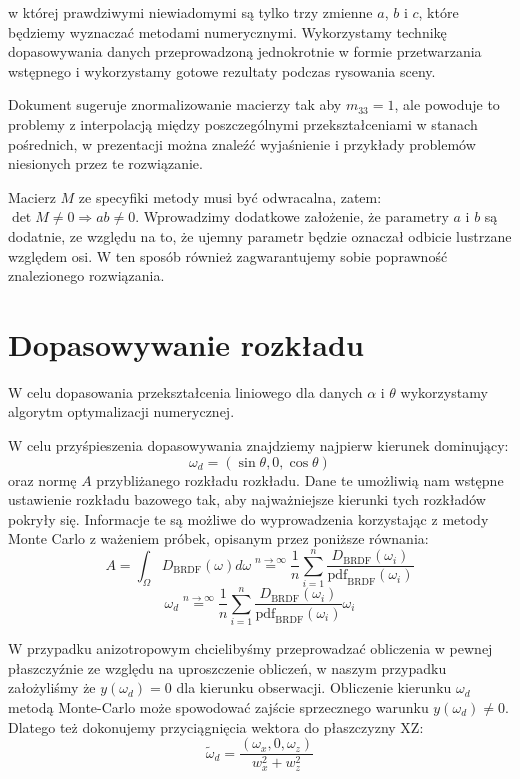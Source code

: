 \documentclass[../main.tex]{subfiles}
\begin{document}
w której prawdziwymi niewiadomymi są tylko trzy zmienne $a$, $b$ i $c$, które będziemy wyznaczać metodami numerycznymi. Wykorzystamy technikę dopasowywania danych przeprowadzoną jednokrotnie w formie przetwarzania wstępnego i wykorzystamy gotowe rezultaty podczas rysowania sceny.

Dokument \cite{ltc_heitz} sugeruje znormalizowanie macierzy tak aby $m_{33}=1$, ale powoduje to problemy z interpolacją między poszczególnymi przekształceniami w stanach pośrednich, w prezentacji \cite{LTCJourneyPresentation} można znaleźć wyjaśnienie i przykłady problemów niesionych przez te rozwiązanie.

Macierz $M$ ze specyfiki metody musi być odwracalna, zatem: $\det M \neq 0 \Rightarrow ab \neq 0$. Wprowadzimy dodatkowe założenie, że parametry $a$ i $b$ są dodatnie, ze względu na to, że ujemny parametr będzie oznaczał odbicie lustrzane względem osi. W ten sposób również zagwarantujemy sobie poprawność znalezionego rozwiązania.

\section{Dopasowywanie rozkładu}

W celu dopasowania przekształcenia liniowego dla danych $\alpha$ i $\theta$ wykorzystamy algorytm optymalizacji numerycznej.

W celu przyśpieszenia dopasowywania znajdziemy najpierw kierunek dominujący:
\[ 
    \omega_d = \left(\sin\theta, 0, \cos\theta\right) 
\]
\noindent oraz normę $A$ przybliżanego rozkładu rozkładu. Dane te umożliwią nam wstępne ustawienie rozkładu bazowego tak, aby najważniejsze kierunki tych rozkładów pokryły się. Informacje te są możliwe do wyprowadzenia korzystając z metody Monte Carlo z ważeniem próbek, opisanym przez poniższe równania:
\[
A = \int_{\Omega} D_{\text{BRDF}}(\omega)d\omega
\stackrel{n \rightarrow \infty}{=}
\frac{1}{n} \sum_{i=1}^{n} {
  \frac{
    D_{\text{BRDF}}(\omega_i)
  }{
    \text{pdf}_{\text{BRDF}}(\omega_i)
  }
}
\]
\[
\omega_d
\stackrel{n \rightarrow \infty}{=}
\frac{1}{n} \sum_{i=1}^{n} {
  \frac{
    D_{\text{BRDF}}(\omega_i)
  }{
    \text{pdf}_{\text{BRDF}}(\omega_i)
  }
  \omega_i
}
\]

W przypadku anizotropowym chcielibyśmy przeprowadzać obliczenia w pewnej płaszczyźnie ze względu na uproszczenie obliczeń, w naszym przypadku założyliśmy że $y(\omega_d)=0$ dla kierunku obserwacji.  Obliczenie kierunku $\omega_d$ metodą Monte-Carlo może spowodować zajście sprzecznego warunku $y(\omega_d) \neq 0$. Dlatego też dokonujemy przyciągnięcia wektora do płaszczyzny XZ:
\[
\widetilde{\omega}_d = \frac{
    \left( \omega_x,0,\omega_z \right)
  }{
    w_x^2+w_z^2
  }
\]
\end{document}
